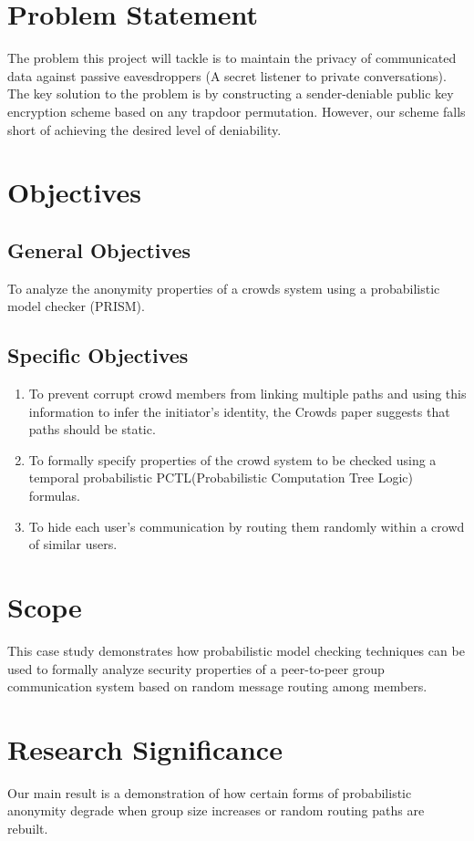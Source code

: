\documentclass{article}
\begin{document}
\section{Problem Statement}
The problem this project will tackle is to maintain the privacy of
communicated data against passive eavesdroppers (A secret listener to private
conversations). The key solution to the problem is by constructing a
sender-deniable public key encryption scheme based on any trapdoor permutation.
However, our scheme falls short of achieving the desired level of deniability.
\section{Objectives}
\subsection{General Objectives}
 To analyze the anonymity properties of a crowds system using a probabilistic model checker (PRISM).
\subsection{Specific Objectives}
\begin{enumerate}
\item To prevent corrupt crowd members from linking multiple paths and using this information to infer the initiator’s identity, the Crowds paper suggests that paths should be static.
\item To formally specify properties of the crowd system to be checked using a temporal probabilistic PCTL(Probabilistic Computation Tree Logic) formulas.
\item To hide each user’s communication by routing them randomly within a crowd of similar users.
\end{enumerate}

\section{Scope}
 This case study demonstrates how probabilistic model checking techniques can be used to formally analyze security
properties of a peer-to-peer group communication system based on random message routing among members.
\section{Research Significance}
Our main result is a demonstration of how certain forms of probabilistic anonymity degrade when group size increases or random routing paths are rebuilt.
\end{document}
